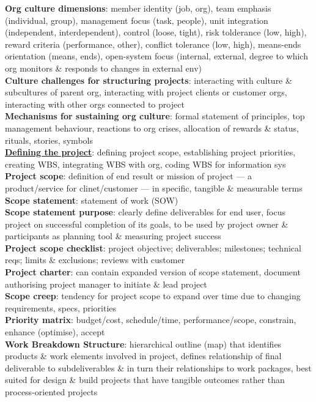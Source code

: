 \documentclass[a4paper]{article}
\begin{document}
\begin{multicols}{3}
        \textbf{Org culture dimensions}: member identity (job, org), team emphasis (individual, group), management focus (task, people), unit integration (independent, interdependent), control (loose, tight), risk tolderance (low, high), reward criteria (performance, other), conflict tolerance (low, high), means-ends orientation (means, ends), open-system focus (internal, external, degree to which org monitors \& responds to changes in external env)\\
        \textbf{Culture challenges for structuring projects}: interacting with culture \& subcultures of parent org, interacting with project clients or customer orgs, interacting with other orgs connected to project\\
        \textbf{Mechanisms for sustaining org culture}: formal statement of principles, top management behaviour, reactions to org crises, allocation of rewards \& status, rituals, stories, symbols\\
        \underline{\textbf{Defining the project}}: defining project scope, establishing project priorities, creating WBS, integrating WBS with org, coding WBS for information sys\\
        \textbf{Project scope}: definition of end result or mission of project --- a product/service for clinet/customer --- in specific, tangible \& measurable terms\\
        \textbf{Scope statement}: statement of work (SOW)\\
        \textbf{Scope statement purpose}: clearly define deliverables for end user, focus project on successful completion of its goals, to be used by project owner \& participants as planning tool \& measuring project success\\
        \textbf{Project scope checklist}: project objective; deliverables; milestones; technical reqs; limits \& exclusions; reviews with customer\\
        \textbf{Project charter}: can contain expanded version of scope statement, document authorising project manager to initiate \& lead project\\
        \textbf{Scope creep}: tendency for project scope to expand over time due to changing requirements, specs, priorities\\
        \textbf{Priority matrix}: budget/cost, schedule/time, performance/scope, constrain, enhance (optimise), accept\\
        \textbf{Work Breakdown Structure}: hierarchical outline (map) that identifies products \& work elements involved in project, defines relationship of final deliverable to subdeliverables \& in turn their relationships to work packages, best suited for design \& build projects that have tangible outcomes rather than process-oriented projects\\

\end{multicols}
\end{document}
